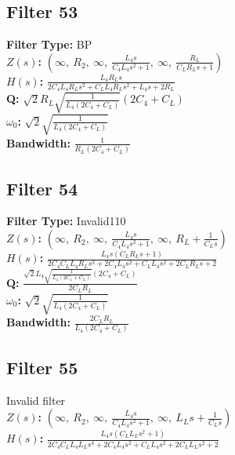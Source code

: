 \documentclass{article}
\begin{document}
\subsection*{Filter 53}
\textbf{Filter Type:} BP \\ 
\textbf{$Z(s)$:} $\left( \infty, \  R_{2}, \  \infty, \  \frac{L_{4} s}{C_{4} L_{4} s^{2} + 1}, \  \infty, \  \frac{R_{L}}{C_{L} R_{L} s + 1}\right)$ \\ 
\textbf{$H(s)$:} $\frac{L_{4} R_{L} s}{2 C_{4} L_{4} R_{L} s^{2} + C_{L} L_{4} R_{L} s^{2} + L_{4} s + 2 R_{L}}$ \\ 
\textbf{Q:} $\sqrt{2} R_{L} \sqrt{\frac{1}{L_{4} \left(2 C_{4} + C_{L}\right)}} \left(2 C_{4} + C_{L}\right)$ \\ 
\textbf{$\omega_0$:} $\sqrt{2} \sqrt{\frac{1}{L_{4} \left(2 C_{4} + C_{L}\right)}}$ \\ 
\textbf{Bandwidth:} $\frac{1}{R_{L} \left(2 C_{4} + C_{L}\right)}$ \\ 
\subsection*{Filter 54}
\textbf{Filter Type:} Invalid110 \\ 
\textbf{$Z(s)$:} $\left( \infty, \  R_{2}, \  \infty, \  \frac{L_{4} s}{C_{4} L_{4} s^{2} + 1}, \  \infty, \  R_{L} + \frac{1}{C_{L} s}\right)$ \\ 
\textbf{$H(s)$:} $\frac{L_{4} s \left(C_{L} R_{L} s + 1\right)}{2 C_{4} C_{L} L_{4} R_{L} s^{3} + 2 C_{4} L_{4} s^{2} + C_{L} L_{4} s^{2} + 2 C_{L} R_{L} s + 2}$ \\ 
\textbf{Q:} $\frac{\sqrt{2} L_{4} \sqrt{\frac{1}{L_{4} \left(2 C_{4} + C_{L}\right)}} \left(2 C_{4} + C_{L}\right)}{2 C_{L} R_{L}}$ \\ 
\textbf{$\omega_0$:} $\sqrt{2} \sqrt{\frac{1}{L_{4} \left(2 C_{4} + C_{L}\right)}}$ \\ 
\textbf{Bandwidth:} $\frac{2 C_{L} R_{L}}{L_{4} \left(2 C_{4} + C_{L}\right)}$ \\ 
\subsection*{Filter 55}
Invalid filter \\ 
\textbf{$Z(s)$:} $\left( \infty, \  R_{2}, \  \infty, \  \frac{L_{4} s}{C_{4} L_{4} s^{2} + 1}, \  \infty, \  L_{L} s + \frac{1}{C_{L} s}\right)$ \\ 
\textbf{$H(s)$:} $\frac{L_{4} s \left(C_{L} L_{L} s^{2} + 1\right)}{2 C_{4} C_{L} L_{4} L_{L} s^{4} + 2 C_{4} L_{4} s^{2} + C_{L} L_{4} s^{2} + 2 C_{L} L_{L} s^{2} + 2}$ \\ 
\end{document}
